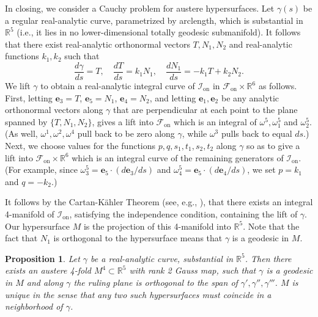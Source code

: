 \documentclass[12pt,reqno]{amsart}
\newtheorem{prop}[theorem]{Proposition}
\theoremstyle{definition}
\theoremstyle{remark}
\begin{document}
In closing, we consider a Cauchy
problem for austere hypersurfaces.  Let $\gamma(s)$ be a regular real-analytic curve, parametrized by arclength, which is substantial in ${\mathbb R}^5$ (i.e., it lies in no lower-dimensional totally geodesic submanifold).  It follows that there exist real-analytic orthonormal vectors $T, N_1, N_2$
and real-analytic functions $k_1, k_2$ such that
$$\dfrac{d\gamma}{ds} = T, \quad \dfrac{d T}{ds} = k_1 N_1, \quad \dfrac{d N_1}{ds} = -k_1 T + k_2 N_2.$$
We lift $\gamma$ to obtain a real-analytic integral curve of ${{{\mathcal I}}_{\operatorname{on}}}$ in ${{\mathscr F}_{\operatorname{on}}}\times {\mathbb R}^6$ as follows.
First, letting ${\mathbf e}_3 = T$, ${\mathbf e}_5=N_1$, ${\mathbf e}_4=N_2$, and letting ${\mathbf e}_1, {\mathbf e}_2$ be any analytic
orthonormal vectors along $\gamma$ that are perpendicular at each point to the plane spanned by $\{ T, N_1, N_2\}$,
gives a lift into ${{\mathscr F}_{\operatorname{on}}}$ which is an integral of ${\omega}^5, {\omega}^5_1$ and ${\omega}^5_2$.  (As well, ${\omega}^1, {\omega}^2, {\omega}^4$ pull back to be zero along $\gamma$, while ${\omega}^3$ pulls back to equal $ds$.)
Next, we choose values for the
functions $p,q,s_1,t_1, s_2, t_2$ along $\gamma$ so as to give a lift into ${{\mathscr F}_{\operatorname{on}}}\times {\mathbb R}^6$ which
is an integral curve of the remaining generators of ${{{\mathcal I}}_{\operatorname{on}}}$.  (For example, since
$\omega^5_3= {\mathbf e}_5 \cdot (d{\mathbf e}_3/ds)$ and $\omega^5_4= {\mathbf e}_5 \cdot (d{\mathbf e}_4/ds)$, we set $p=k_1$ and $q=-k_2$.)

It follows by the Cartan-K\"ahler Theorem (see, e.g., \cite{CFB}), that there exists an
integral 4-manifold of ${{{\mathcal I}}_{\operatorname{on}}}$, satisfying the independence condition, containing the lift of $\gamma$.
Our hypersurface $M$ is the projection of this 4-manifold into ${\mathbb R}^5$.
Note that the fact that $N_1$ is orthogonal to the hypersurface means that $\gamma$ is a geodesic in $M$.

\begin{prop}
 Let $\gamma$ be a real-analytic curve, substantial in ${\mathbb R}^5$.  Then there exists an austere 4-fold $M^4\subset {\mathbb R}^5$ with rank 2 Gauss map, such that $\gamma$ is a geodesic in $M$ and along $\gamma$ the ruling plane is orthogonal to the span of $\gamma', \gamma'', \gamma'''$.  $M$ is unique in the sense that
 any two such hypersurfaces must coincide in a neighborhood of $\gamma$.\end{prop}
\end{document}
